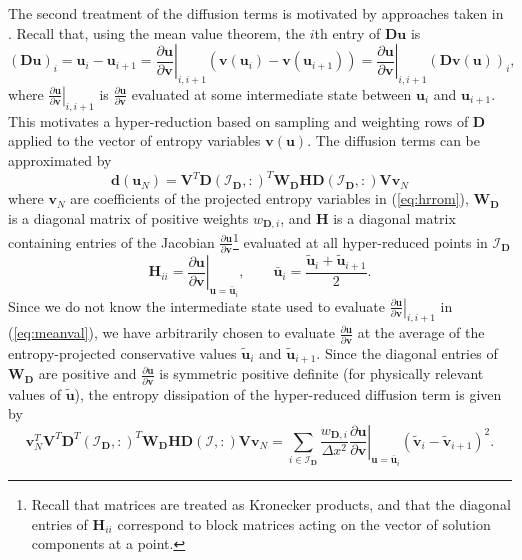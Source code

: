 \documentclass[review]{siamart171218}
\theoremstyle{assumption}
\renewcommand{\tilde}{\widetilde}
\newcommand{\pd}[2]{\frac{\partial#1}{\partial#2}}
\newcommand{\LRp}[1]{\left( #1 \right)}
\newcommand{\LRl}[1]{\left. #1 \right|}
\begin{document}
The second treatment of the diffusion terms is motivated by approaches taken in \cite{carpenter2014entropy, chen2017entropy, zakerzadeh2017entropy, upperman2019entropy}.  Recall that, using the mean value theorem, the $i$th entry of $\bm{D}\bm{u}$ is
\begin{equation}
\LRp{\bm{D}\bm{u}}_i = \bm{u}_i - \bm{u}_{i+1} = \LRl{\pd{\bm{u}}{\bm{v}}}_{i,i+1} \LRp{\bm{v}(\bm{u}_i)-\bm{v}(\bm{u}_{i+1})} = \LRl{\pd{\bm{u}}{\bm{v}}}_{i,i+1}  \LRp{\bm{D}\bm{v}(\bm{u})}_i,
\label{eq:meanval}
\end{equation}
where $\LRl{\pd{\bm{u}}{\bm{v}}}_{i,i+1}$ is $\pd{\bm{u}}{\bm{v}}$ evaluated at some intermediate state between $\bm{u}_i$ and $\bm{u}_{i+1}$.  This motivates a hyper-reduction based on sampling and weighting rows of $\bm{D}$ applied to the vector of entropy variables $\bm{v}(\bm{u})$.  The diffusion terms can be approximated by 
\begin{equation}
\bm{d}(\bm{u}_N) = \bm{V}^T\bm{D}\LRp{\mathcal{I}_{\bm{D}},:}^T \bm{W}_{\bm{D}} \bm{H} \bm{D}\LRp{\mathcal{I}_{\bm{D}},:}\bm{V} \bm{v}_N
\label{eq:visc2}
\end{equation}
where $\bm{v}_N$ are coefficients of the projected entropy variables in (\ref{eq:hrrom}), $\bm{W}_{\bm{D}}$ is a diagonal matrix of positive weights $w_{\bm{D},i}$, and $\bm{H}$ is a diagonal matrix containing entries of the Jacobian $\pd{\bm{u}}{\bm{v}}$\footnote{Recall that matrices are treated as Kronecker products, and that the diagonal entries of $\bm{H}_{ii}$ correspond to block matrices acting on the vector of solution components at a point.} evaluated at all hyper-reduced points in $\mathcal{I}_{\bm{D}}$ 
\[
\bm{H}_{ii} = \LRl{\pd{\bm{u}}{\bm{v}}}_{\bm{u} = \bar{\bm{u}}_i}, \qquad \bar{\bm{u}}_i = \frac{\tilde{\bm{u}}_i + \tilde{\bm{u}}_{i+1}}{2}.
\]
Since we do not know the intermediate state used to evaluate $\LRl{\pd{\bm{u}}{\bm{v}}}_{i,i+1}$ in (\ref{eq:meanval}), 
we have arbitrarily chosen to evaluate $\pd{\bm{u}}{\bm{v}}$ at the average of the entropy-projected conservative values $\tilde{\bm{u}}_i$ and $\tilde{\bm{u}}_{i+1}$.  Since the diagonal entries of $\bm{W}_{\bm{D}}$ are positive and $\pd{\bm{u}}{\bm{v}}$ is symmetric positive definite (for physically relevant values of $\tilde{\bm{u}}$), the entropy dissipation of the hyper-reduced diffusion term is given by
\[
\bm{v}_N^T\bm{V}^T\bm{D}^T\LRp{\mathcal{I}_{\bm{D}},:}^T \bm{W}_{\bm{D}} \bm{H} \bm{D}\LRp{\mathcal{I},:}\bm{V} \bm{v}_N = 
\sum_{i\in \mathcal{I}_{\bm{D}}} \frac{w_{\bm{D},i}}{\Delta x^2} \LRl{\pd{\bm{u}}{\bm{v}}}_{\bm{u}=\bar{\bm{u}}_i} \LRp{\tilde{\bm{v}}_i - \tilde{\bm{v}}_{i+1}}^2.
\]
\end{document}
